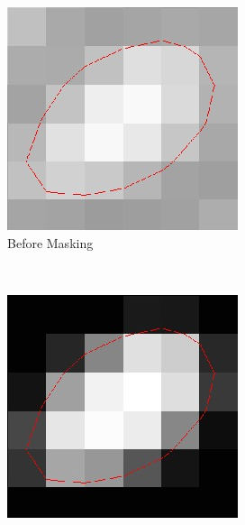 \documentclass[10pt,journal,compsoc, draftclsnofoot,onecolumn]{IEEEtran}
\begin{document}
\begin{figure}[h!]
    \centering
    \begin{subfigure}[b]{0.15\textwidth}
        \includegraphics[width=\textwidth]{unmasked.jpg}
        \caption{Before Masking}
    \end{subfigure}
    ~ %
    \begin{subfigure}[b]{0.15\textwidth}
        \includegraphics[width=\textwidth]{soft_masking.jpg}

\end{subfigure}
\end{figure}
\end{document}

